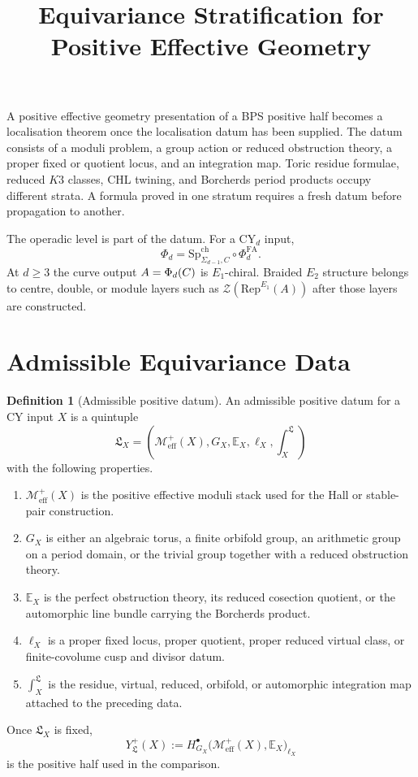 \documentclass[11pt]{amsart}
\title{Equivariance Stratification for Positive Effective Geometry}
\author{}
\date{}
\providecommand{\Rep}{\mathrm{Rep}}
\providecommand{\cM}{\mathcal{M}}
\providecommand{\cZ}{\mathcal{Z}}
\providecommand{\Meff}{\cM^{+}_{\mathrm{eff}}}
\providecommand{\Yp}{Y^{+}}
\providecommand{\SpCh}{\mathrm{Sp}^{\mathrm{ch}}}
\providecommand{\PhiFA}{\Phi^{\mathrm{FA}}}
\theoremstyle{plain}
\theoremstyle{definition}
\newtheorem{definition}[theorem]{Definition}
\theoremstyle{remark}
\begin{document}
\maketitle

A positive effective geometry presentation of a BPS positive half becomes a
localisation theorem once the localisation datum has been supplied.
The datum consists of a moduli problem, a group action or reduced
obstruction theory, a proper fixed or quotient locus, and an integration
map. Toric residue formulae, reduced $K3$ classes, CHL twining, and
Borcherds period products occupy different strata. A formula proved in
one stratum requires a fresh datum before propagation to another.

The operadic level is part of the datum. For a CY$_d$ input,
\[
 \Phi_d=\SpCh_{\Sigma_{d-1},C}\circ\PhiFA_d .
\]
At $d\geq 3$ the curve output $A=\Phi_d(C)$ is $E_1$-chiral. Braided
$E_2$ structure belongs to centre, double, or module layers such as
$\cZ(\Rep^{E_1}(A))$ after those layers are constructed.

\section{Admissible Equivariance Data}

\begin{definition}[Admissible positive datum]\label{def:admissible-positive-datum}
An admissible positive datum for a CY input $X$ is a quintuple
\[
 \mathfrak L_X=(\Meff(X),G_X,\mathbb E_X,\ell_X,\int_X^{\mathfrak L})
\]
with the following properties.
\begin{enumerate}
\item $\Meff(X)$ is the positive effective moduli stack used for the
Hall or stable-pair construction.
\item $G_X$ is either an algebraic torus, a finite orbifold group, an
arithmetic group on a period domain, or the trivial group together with
a reduced obstruction theory.
\item $\mathbb E_X$ is the perfect obstruction theory, its reduced
cosection quotient, or the automorphic line bundle carrying the
Borcherds product.
\item $\ell_X$ is a proper fixed locus, proper quotient, proper reduced
virtual class, or finite-covolume cusp and divisor datum.
\item $\int_X^{\mathfrak L}$ is the residue, virtual, reduced, orbifold,
or automorphic integration map attached to the preceding data.
\end{enumerate}
Once $\mathfrak L_X$ is fixed,
\[
 \Yp_{\mathfrak L}(X)
 :=
 H^\bullet_{G_X}\bigl(\Meff(X),\mathbb E_X\bigr)_{\ell_X}
\]
is the positive half used in the comparison.
\end{definition}
\end{document}
